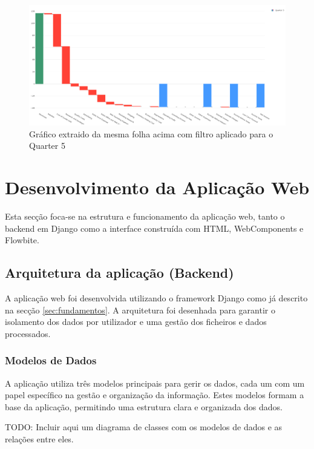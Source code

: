 \begin{figure}[H]
\centering
\includegraphics[width=\textwidth]{./img/after}
\caption{Gráfico extraido da mesma folha acima com filtro aplicado para o Quarter 5}
\end{figure}

\section{Desenvolvimento da Aplicação Web}

Esta secção foca-se na estrutura e funcionamento da aplicação web, tanto o backend em Django como a interface construída com HTML, WebComponents e Flowbite.

\subsection{Arquitetura da aplicação (Backend)}

A aplicação web foi desenvolvida utilizando o framework Django como já descrito na secção \ref{sec:fundamentos}. A arquitetura foi desenhada para garantir o isolamento dos dados por utilizador e uma gestão dos ficheiros e dados processados.

\subsubsection{Modelos de Dados}

A aplicação utiliza três modelos principais para gerir os dados, cada um com um papel específico na gestão e organização da informação. Estes modelos formam a base da aplicação, permitindo uma estrutura clara e organizada dos dados.

TODO: Incluir aqui um diagrama de classes com os modelos de dados e as relações entre eles.

